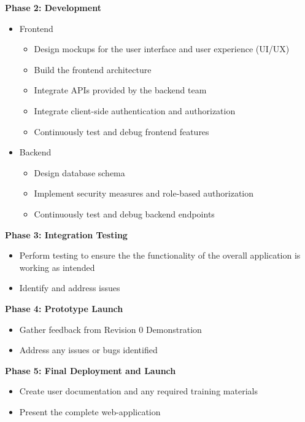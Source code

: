 \documentclass[12pt]{article}
\begin{document}
\textbf{Phase 2: Development}
\begin{itemize}
    \item Frontend
        \begin{itemize}
            \item Design mockups for the user interface and user experience (UI/UX)
            \item Build the frontend architecture
            \item Integrate APIs provided by the backend team
            \item Integrate client-side authentication and authorization
            \item Continuously test and debug frontend features
        \end{itemize}
    \item Backend
        \begin{itemize}
            \item Design database schema
            \item Implement security measures and role-based authorization
            \item Continuously test and debug backend endpoints
        \end{itemize}
\end{itemize}

\textbf{Phase 3: Integration Testing}
\begin{itemize}
    \item Perform testing to ensure the the functionality of the overall application is working as intended
    \item Identify and address issues
\end{itemize}

\textbf{Phase 4: Prototype Launch}
\begin{itemize}
    \item Gather feedback from Revision 0 Demonstration
    \item Address any issues or bugs identified
\end{itemize}

\textbf{Phase 5: Final Deployment and Launch}
\begin{itemize}
    \item Create user documentation and any required training materials
    \item Present the complete web-application 
\end{itemize}
\end{document}
